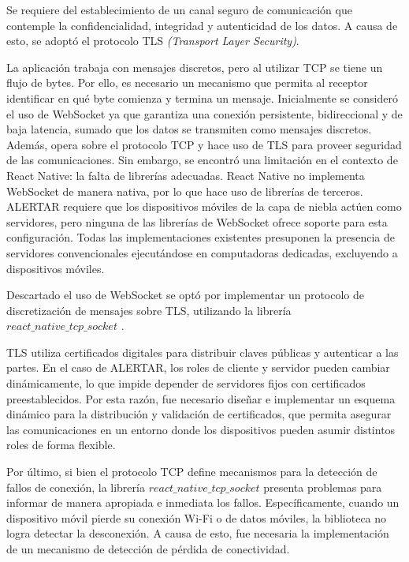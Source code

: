 Se requiere del establecimiento de un canal seguro de comunicación que contemple la confidencialidad, integridad y autenticidad de los datos. A causa de esto, se adoptó el protocolo TLS \textit{(Transport Layer Security)}.

La aplicación trabaja con mensajes discretos, pero al utilizar TCP se tiene un flujo de bytes. Por ello, es necesario un mecanismo que permita al receptor identificar en qué byte comienza y termina un mensaje. Inicialmente se consideró el uso de WebSocket \cite{fette2011websocket} ya que garantiza una conexión persistente, bidireccional y de baja latencia, sumado que los datos se transmiten como mensajes discretos. Además, opera sobre el protocolo TCP y hace uso de TLS para proveer seguridad de las comunicaciones. Sin embargo, se encontró una limitación en el contexto de React Native: la falta de librerías adecuadas. React Native no implementa WebSocket de manera nativa, por lo que hace uso de librerías de terceros. ALERTAR requiere que los dispositivos móviles de la capa de niebla actúen como servidores, pero ninguna de las librerías de WebSocket ofrece soporte para esta configuración. Todas las implementaciones existentes presuponen la presencia de servidores convencionales ejecutándose en computadoras dedicadas, excluyendo a dispositivos móviles.

Descartado el uso de WebSocket se optó por implementar un protocolo de discretización de mensajes sobre TLS, utilizando la librería $react\_native\_tcp\_socket$ \cite{react-native-tcp-socket}.

TLS utiliza certificados digitales para distribuir claves públicas y autenticar a las partes. En el caso de ALERTAR, los roles de cliente y servidor pueden cambiar dinámicamente, lo que impide depender de servidores fijos con certificados preestablecidos. Por esta razón, fue necesario diseñar e implementar un esquema dinámico para la distribución y validación de certificados, que permita asegurar las comunicaciones en un entorno donde los dispositivos pueden asumir distintos roles de forma flexible.

Por último, si bien el protocolo TCP define mecanismos para la detección de fallos de conexión, la librería $react\_native\_tcp\_socket$ presenta problemas para informar de manera apropiada e inmediata los fallos. Específicamente, cuando un dispositivo móvil pierde su conexión Wi-Fi o de datos móviles, la biblioteca no logra detectar la desconexión. A causa de esto, fue necesaria la implementación de un mecanismo de detección de pérdida de conectividad.

